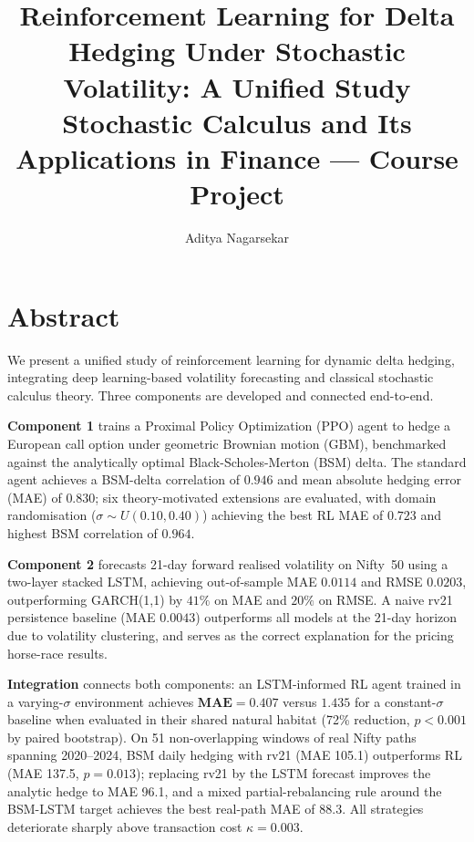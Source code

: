 \documentclass[12pt,a4paper]{article}
\title{%
  \Large\textbf{Reinforcement Learning for Delta Hedging Under Stochastic
  Volatility: A Unified Study}\\[0.8em]
  \large Stochastic Calculus and Its Applications in Finance --- Course Project
}
\author{Aditya Nagarsekar}
\date{}
\begin{document}
\maketitle
\thispagestyle{empty}
\newpage
\tableofcontents
\newpage

\section*{Abstract}

We present a unified study of reinforcement learning for dynamic delta hedging,
integrating deep learning-based volatility forecasting and classical stochastic
calculus theory.  Three components are developed and connected end-to-end.

\textbf{Component 1} trains a Proximal Policy Optimization (PPO) agent to
hedge a European call option under geometric Brownian motion (GBM), benchmarked
against the analytically optimal Black-Scholes-Merton (BSM) delta.  The
standard agent achieves a BSM-delta correlation of $0.946$ and mean absolute
hedging error (MAE) of $0.830$; six theory-motivated extensions are evaluated,
with domain randomisation ($\sigma\sim U(0.10,0.40)$) achieving the best RL
MAE of $\mathbf{0.723}$ and highest BSM correlation of $\mathbf{0.964}$.

\textbf{Component 2} forecasts 21-day forward realised volatility on Nifty~50
using a two-layer stacked LSTM, achieving out-of-sample MAE $0.0114$ and RMSE
$0.0203$, outperforming GARCH(1,1) by $41\%$ on MAE and $20\%$ on RMSE.  A
naive rv21 persistence baseline (MAE $0.0043$) outperforms all models at the
21-day horizon due to volatility clustering, and serves as the correct
explanation for the pricing horse-race results.

\textbf{Integration} connects both components: an LSTM-informed RL agent
trained in a varying-$\sigma$ environment achieves $\mathbf{MAE = 0.407}$
versus $1.435$ for a constant-$\sigma$ baseline when evaluated in their shared
natural habitat (72\% reduction, $p < 0.001$ by paired bootstrap).  On 51
non-overlapping windows of real Nifty paths spanning 2020--2024, BSM daily
hedging with rv21 (MAE 105.1) outperforms RL (MAE 137.5, $p=0.013$); replacing
rv21 by the LSTM forecast improves the analytic hedge to MAE 96.1, and a mixed
partial-rebalancing rule around the BSM-LSTM target achieves the best real-path
MAE of 88.3.  All strategies deteriorate sharply above transaction cost
$\kappa = 0.003$.
\end{document}
